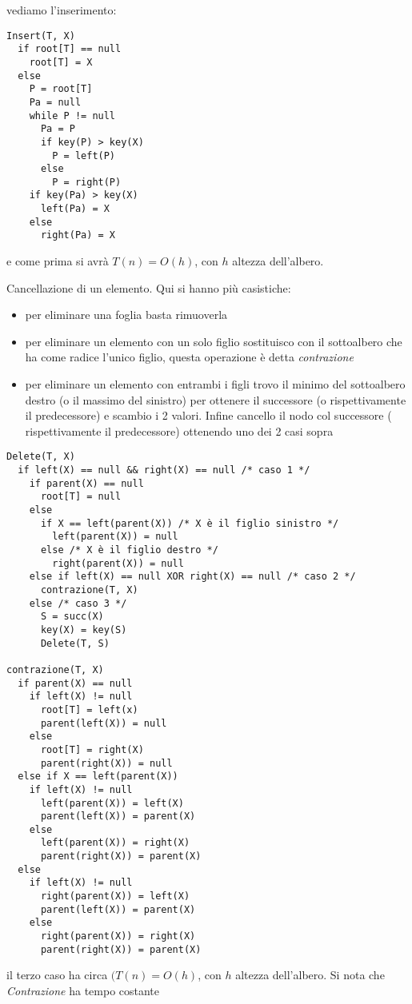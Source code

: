 \documentclass[a4paper,12pt,oneside,tikz]{book}
\begin{document}
\begin{esempio}
	vediamo l'inserimento:
	\begin{verbatim}
Insert(T, X)
  if root[T] == null
    root[T] = X
  else
    P = root[T]
    Pa = null
    while P != null
      Pa = P
      if key(P) > key(X)
        P = left(P)
      else
        P = right(P)
    if key(Pa) > key(X)
      left(Pa) = X
    else
      right(Pa) = X
\end{verbatim}
	e come prima si avrà $T(n)=O(h)$, con $h$ altezza dell'albero.
\end{esempio}
\begin{esempio}
	Cancellazione di un elemento. Qui si hanno più casistiche:
	\begin{itemize}
		\item per eliminare una foglia basta rimuoverla
		\item per eliminare un elemento con un solo figlio sostituisco con il sottoalbero che ha come radice l'unico figlio, questa operazione è detta \textit{contrazione}
		\item per eliminare un elemento con entrambi i figli trovo il minimo del sottoalbero destro (o il massimo del sinistro) per ottenere il successore (o rispettivamente il predecessore) e scambio i 2 valori. Infine cancello il nodo col successore ( rispettivamente il predecessore) ottenendo uno dei 2 casi sopra
	\end{itemize}
	\begin{verbatim}
Delete(T, X)
  if left(X) == null && right(X) == null /* caso 1 */
    if parent(X) == null 
      root[T] = null
    else
      if X == left(parent(X)) /* X è il figlio sinistro */
        left(parent(X)) = null
      else /* X è il figlio destro */
        right(parent(X)) = null
    else if left(X) == null XOR right(X) == null /* caso 2 */
      contrazione(T, X)
    else /* caso 3 */
      S = succ(X)
      key(X) = key(S)
      Delete(T, S)
  
contrazione(T, X)
  if parent(X) == null
    if left(X) != null
      root[T] = left(x)
      parent(left(X)) = null
    else
      root[T] = right(X)
      parent(right(X)) = null
  else if X == left(parent(X))
    if left(X) != null
      left(parent(X)) = left(X)
      parent(left(X)) = parent(X)
    else
      left(parent(X)) = right(X)
      parent(right(X)) = parent(X)
  else
    if left(X) != null
      right(parent(X)) = left(X)
      parent(left(X)) = parent(X)
    else
      right(parent(X)) = right(X)
      parent(right(X)) = parent(X)
\end{verbatim}
	il terzo caso ha circa $(T(n)=O(h)$, con $h$ altezza dell'albero. Si nota che \textit{Contrazione} ha tempo costante
\end{esempio}
\end{document}
